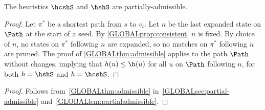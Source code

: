 \begin{lem}\label{GLOBALlem:partialadmissible}
  The heuristics $\hcshS$ and $\hshS$ are partially-admissible.
\end{lem}
\begin{proof}
  Let $\pi^*$ be a shortest path from $s$ to $v_t$. Let $n$ be the last
  expanded state on $\Path$ at the start of a seed.
  By \cref{GLOBALprop:consistent} $n$ is fixed.
  By choice of $n$, no states on $\pi^*$ following $n$ are expanded, so
  no matches on $\pi^*$ following $n$ are pruned.
  The proof of \cref{GLOBALthm:admissible} applies to the path $\Path$ without
  changes, implying that $h(u) \leq \h(u)$ for all $u$ on $\Path$ following
  $n$, for both $h=\hshS$ and $h=\hcshS$.
\end{proof}

\thmprunedcorrect
\begin{proof}
Follows from~\cref{GLOBALthm:admissible} in~\cref{GLOBALsec:partial-admissible}
and~\cref{GLOBALlem:partialadmissible}.
\end{proof}

